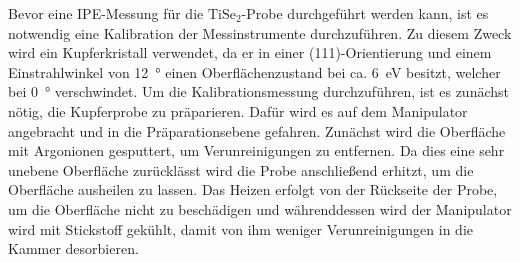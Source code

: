 Bevor eine IPE-Messung für die $\text{TiSe}_2$-Probe durchgeführt werden kann, ist es notwendig eine Kalibration der Messinstrumente durchzuführen.
Zu diesem Zweck wird ein Kupferkristall verwendet, da er in einer (111)-Orientierung und einem Einstrahlwinkel von \SI{12}{\degree} einen Oberflächenzustand bei ca. \SI{6}{\electronvolt} besitzt, welcher bei \SI{0}{\degree} verschwindet.
Um die Kalibrationsmessung durchzuführen, ist es zunächst nötig, die Kupferprobe zu präparieren.
Dafür wird es auf dem Manipulator angebracht und in die Präparationsebene gefahren.
Zunächst wird die Oberfläche mit Argonionen gesputtert, um Verunreinigungen zu entfernen.
Da dies eine sehr unebene Oberfläche zurücklässt wird die Probe anschließend erhitzt, um die Oberfläche ausheilen zu lassen.
Das Heizen erfolgt von der Rückseite der Probe, um die Oberfläche nicht zu beschädigen und währenddessen wird der Manipulator wird mit Stickstoff gekühlt, damit von ihm weniger Verunreinigungen in die Kammer desorbieren.

